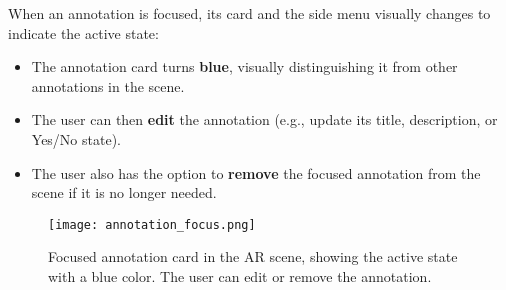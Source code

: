 When an annotation is focused, its card and the side menu visually changes to indicate the active state:
\begin{itemize}
    \item The annotation card turns \textbf{blue}, visually distinguishing it from other annotations in the scene.
    \item The user can then \textbf{edit} the annotation (e.g., update its title, description, or Yes/No state).
    \item The user also has the option to \textbf{remove} the focused annotation from the scene if it is no longer needed.
\end{itemize}

\begin{figure}[H]
            \centering
            \texttt{[image: annotation\_focus.png]}
            \caption{\centering Focused annotation card in the AR scene, showing the active state with a blue color. The user can edit or remove the annotation.}
            \label{fig:annotation_focus}
        \end{figure}


